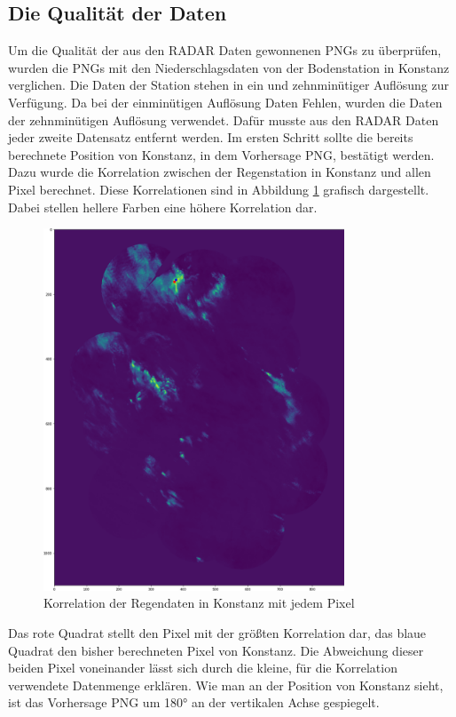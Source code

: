 \subsection{Die Qualität der Daten}
Um die Qualität der aus den RADAR Daten gewonnenen PNGs zu überprüfen, wurden die PNGs mit den Niederschlagsdaten von der 
Bodenstation in Konstanz verglichen. 
Die Daten der Station stehen in ein und zehnminütiger Auflösung zur Verfügung. 
Da bei der einminütigen Auflösung Daten Fehlen, wurden die Daten der zehnminütigen Auflösung verwendet.
Dafür musste aus den RADAR Daten jeder zweite Datensatz entfernt werden. 
Im ersten Schritt sollte die bereits berechnete Position von Konstanz, in dem Vorhersage PNG, bestätigt werden.
Dazu wurde die Korrelation zwischen der Regenstation in Konstanz und allen Pixel berechnet. 
Diese Korrelationen sind in Abbildung \ref{fig:karte_korrelation} grafisch dargestellt.
Dabei stellen hellere Farben eine höhere Korrelation dar. 
\begin{figure}[H]
    \centering
    \includegraphics[width=0.8\textwidth,angle=0]{abb/Korrelation_Karte}
    \caption[Korrelationen der Regendaten in Kartenform]{Korrelation der Regendaten in Konstanz mit jedem Pixel}
   \label{fig:karte_korrelation}
\end{figure}

\noindent 
Das rote Quadrat stellt den Pixel mit der größten Korrelation dar, das blaue Quadrat den bisher berechneten Pixel von Konstanz. 
Die Abweichung dieser beiden Pixel voneinander lässt sich durch die kleine, für die Korrelation verwendete Datenmenge erklären. 
Wie man an der Position von Konstanz sieht, ist das Vorhersage PNG um 180° an der vertikalen Achse gespiegelt.


